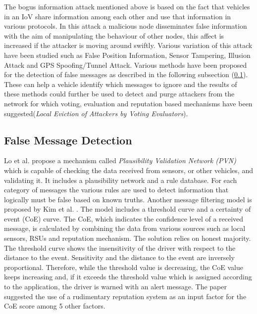\documentclass[journal]{IEEEtran}
\begin{document}
The bogus information attack mentioned above is based on the fact that vehicles in an IoV share information among each other and use that information in various protocols. In this attack a malicious node disseminates false information with the aim of manipulating the behaviour of other nodes, this affect is increased if the attacker is moving around swiftly\cite{c:MotorwayAttack}. Various variation of this attack have been studied\cite{c:AttacksSurvey} such as False Position Information\cite{c:FalsePositionInformation}, Sensor Tampering, Illusion Attack\cite{c:IllusionAttack} and GPS Spoofing/Tunnel Attack\cite{c:TunnelAttack}. Various methods have been proposed for the detection of false messages as described in the following subsection (\ref{sec:RV:FalseMsgDetection}). These can help a vehicle identify which messages to ignore and the results of these methods could further be used to detect and purge attackers from the network for which voting, evaluation and reputation based mechanisms have been suggested\cite{c:MDSandLEAVE}(\textit{Local Eviction of Attackers by Voting Evaluators})\cite{c:messagefilterCoE}. 

\subsection{False Message Detection}
\label{sec:RV:FalseMsgDetection}
Lo et al. \cite{c:IllusionAttack} propose a mechanism called \textit{Plausibility Validation Network (PVN)} which is capable of checking the data received from sensors, or other vehicles, and validating it. It includes a plausibility network and a rule database. For each category of messages the various rules are used to detect information that logically must be false based on known truths.
Another  message filtering model is proposed by Kim et al. \cite{c:messagefilterCoE}. The model includes a threshold curve and a certainty of event (CoE) curve. The CoE, which indicates the confidence level of a received message, is calculated by combining the data from various sources such as local sensors, RSUs and reputation mechanism. The solution relies on honest majority. The threshold curve shows the insensitivity of the driver with respect to the distance to the event. Sensitivity and the distance to the event are inversely proportional. Therefore, while the threshold value is decreasing, the CoE value keeps increasing and, if it exceeds the threshold value which is assigned according to the application, the driver is warned with an alert message. The paper suggested the use of a rudimentary reputation system as an input factor for the CoE score among 5 other factors.
\end{document}
